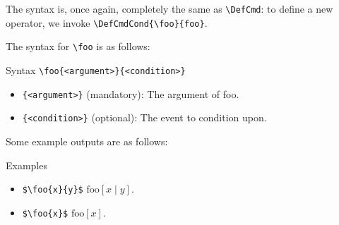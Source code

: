 The syntax is, once again, completely the same as \verb|\DefCmd|: to define a new operator, we invoke \verb|\DefCmdCond{\foo}{foo}|.

The syntax for \verb|\foo| is as follows:

\begin{myframe}{Syntax }
    \verb|\foo{<argument>}{<condition>}|
    \begin{itemize}
        \item \verb|{<argument>}| (mandatory): The argument of foo.
        \item \verb|{<condition>}| (optional): The event to condition upon.
    \end{itemize}
\end{myframe}

Some example outputs are as follows:

\begin{myframe}{Examples }
    \begin{itemize}
        \item \verb|$\foo{x}{y}$| \produces{} $\mathrm{foo}[x \mid y]$.
        \item \verb|$\foo{x}$| \produces{} $\mathrm{foo}[x]$.
    \end{itemize}
\end{myframe}